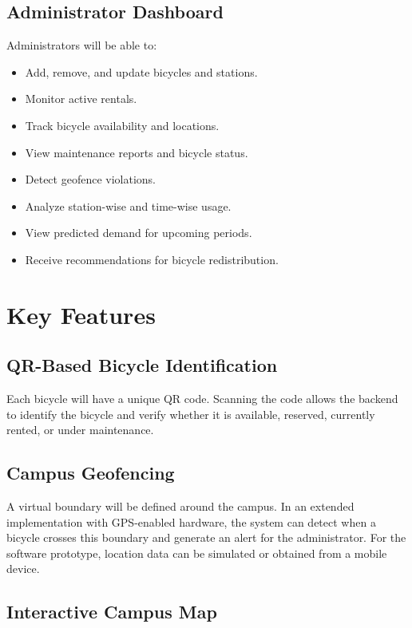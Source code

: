 \documentclass[12pt,a4paper]{article}
\begin{document}
\subsection{Administrator Dashboard}

Administrators will be able to:

\begin{itemize}[leftmargin=*]
    \item Add, remove, and update bicycles and stations.
    \item Monitor active rentals.
    \item Track bicycle availability and locations.
    \item View maintenance reports and bicycle status.
    \item Detect geofence violations.
    \item Analyze station-wise and time-wise usage.
    \item View predicted demand for upcoming periods.
    \item Receive recommendations for bicycle redistribution.
\end{itemize}

\section{Key Features}

\subsection{QR-Based Bicycle Identification}

Each bicycle will have a unique QR code. Scanning the code allows the backend to identify the bicycle and verify whether it is available, reserved, currently rented, or under maintenance.

\subsection{Campus Geofencing}

A virtual boundary will be defined around the campus. In an extended implementation with GPS-enabled hardware, the system can detect when a bicycle crosses this boundary and generate an alert for the administrator. For the software prototype, location data can be simulated or obtained from a mobile device.

\subsection{Interactive Campus Map}
\end{document}
